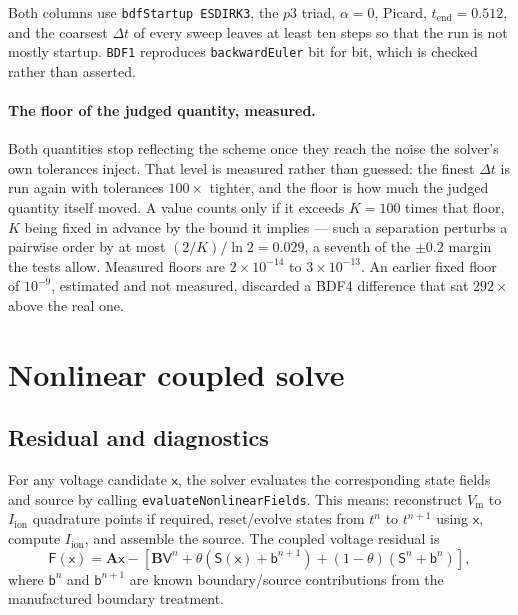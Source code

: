 \documentclass[11pt,a4paper]{article}
\newcommand{\code}[1]{\texttt{\small #1}}
\newcommand{\Vm}{V_{\text{m}}}
\newcommand{\Iion}{I_{\mathrm{ion}}}
\newcommand{\Aimp}{\mathbf{A}}
\newcommand{\Bimp}{\mathbf{B}}
\newcommand{\Fres}{\mathsf{F}}
\begin{document}
Both columns use \code{bdfStartup ESDIRK3}, the $p3$ triad, $\alpha=0$, Picard,
$t_{\text{end}}=0.512$, and the coarsest $\Delta t$ of every sweep leaves at
least ten steps so that the run is not mostly startup. \code{BDF1} reproduces
\code{backwardEuler} bit for bit, which is checked rather than asserted.

\paragraph{The floor of the judged quantity, measured.} Both quantities stop
reflecting the scheme once they reach the noise the solver's own tolerances
inject. That level is measured rather than guessed: the finest $\Delta t$ is run
again with tolerances $100\times$ tighter, and the floor is how much the judged
quantity itself moved. A value counts only if it exceeds $K=100$ times that
floor, $K$ being fixed in advance by the bound it implies --- such a separation
perturbs a pairwise order by at most $(2/K)/\ln 2 = 0.029$, a seventh of the
$\pm0.2$ margin the tests allow. Measured floors are $2\times10^{-14}$ to
$3\times10^{-13}$. An earlier fixed floor of $10^{-9}$, estimated and not
measured, discarded a BDF4 difference that sat $292\times$ above the real one.

\section{Nonlinear coupled solve}

\subsection{Residual and diagnostics}

For any voltage candidate $\mathsf{x}$, the solver evaluates the corresponding
state fields and source by calling \code{evaluateNonlinearFields}. This means:
reconstruct $\Vm$ to $\Iion$ quadrature points if required, reset/evolve states
from $t^n$ to $t^{n+1}$ using $\mathsf{x}$, compute $\Iion$, and assemble the
source. The coupled voltage residual is
\begin{equation}
  \Fres(\mathsf{x})
  =
  \Aimp\mathsf{x}
  -
  \left[
    \Bimp\mathsf{V}^{n}
    +\theta\left(\mathsf{S}(\mathsf{x})+\mathsf{b}^{n+1}\right)
    +(1-\theta)\left(\mathsf{S}^{n}+\mathsf{b}^{n}\right)
  \right],
  \label{eq:nonlinear-residual}
\end{equation}
where $\mathsf{b}^{n}$ and $\mathsf{b}^{n+1}$ are known boundary/source
contributions from the manufactured boundary treatment.
\end{document}
